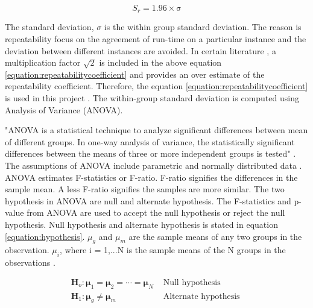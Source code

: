 \begin{equation}
S_r = 1.96 \times \mathrm{\sigma}
\label{equation:repeatabilitycoefficient}
\end{equation}

The standard deviation, $\sigma$ is the within group standard deviation. The reason is repeatability focus on the agreement of run-time on a particular instance and the deviation between different instances are avoided. In certain literature \cite{repeatability_final}, a multiplication factor $\sqrt{2}$ is included in the above equation \ref{equation:repeatabilitycoefficient} and provides an over estimate of the repeatability coefficient. Therefore, the equation \ref{equation:repeatabilitycoefficient} is used in this project \cite{repeatability_final} \cite{repeatability_final2} \cite{repeatability_final3}. The within-group standard deviation is computed using Analysis of Variance (ANOVA). 

"ANOVA is a statistical technique to analyze significant differences between mean of different groups. In one-way analysis of variance, the statistically significant differences between the means of three or more independent groups is tested" \cite{anova} \cite{anova2}. The assumptions of ANOVA include parametric and normally distributed data \cite{anova}. ANOVA estimates F-statistics or F-ratio. F-ratio signifies the differences in the sample mean. A less F-ratio signifies the samples are more similar. The two hypothesis in ANOVA are null and alternate hypothesis. The F-statistics and p-value from ANOVA are used to accept the null hypothesis or reject the null hypothesis. Null hypothesis and alternate hypothesis is stated in equation \ref{equation:hypothesis}. $\mu_g$ and $\mu_m$ are the sample means of any two groups in the observation. $\mu_i$, where i = 1,...N is the sample means of the N groups in the observations \cite{anova}. 

\begin{equation}
\begin{array}{ll}{\boldsymbol{H}_{o}: \boldsymbol{\mu}_{1}=\boldsymbol{\mu}_{2}=\cdots=\boldsymbol{\mu}_{N}} & {\text { Null hypothesis }} \\ {\boldsymbol{H}_{1}: \boldsymbol{\mu}_{g} \neq \boldsymbol{\mu}_{m}} & {\text { Alternate hypothesis }}\end{array}
\label{equation:hypothesis}
\end{equation}


